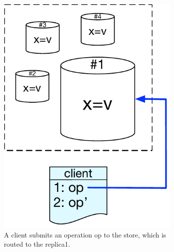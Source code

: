 \begin{figure}[t]
    \centering
    \begin{subfigure}[t]{0.31\textwidth}
    \centering
        \includegraphics[scale=0.36]{Figures/system_model1.pdf}
        \caption{A client submits an operation op to the store, which
	is routed to the replica1.}
        \label{fig:sys_model1}
    \end{subfigure}
    \hfill
    \begin{subfigure}[t]{0.31\textwidth}
        \centering

\end{subfigure}
\end{figure}
